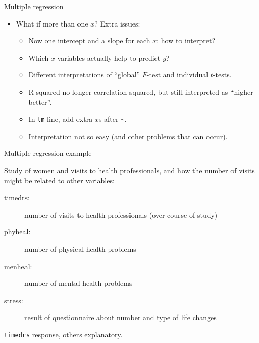 \documentclass[
  ignorenonframetext,
]{beamer}
\begin{document}
\begin{frame}[fragile]{Multiple regression}
\protect\hypertarget{multiple-regression}{}

\begin{itemize}
\item
  What if more than one \(x\)? Extra issues:

  \begin{itemize}
  \item
    Now one intercept and a slope for each \(x\): how to interpret?
  \item
    Which \(x\)-variables actually help to predict \(y\)?
  \item
    Different interpretations of ``global'' \(F\)-test and individual
    \(t\)-tests.
  \item
    R-squared no longer correlation squared, but still interpreted as
    ``higher better''.
  \item
    In \texttt{lm} line, add extra \(x\)s after
    \texttt{\textasciitilde{}}.
  \item
    Interpretation not so easy (and other problems that can occur).
  \end{itemize}
\end{itemize}

\end{frame}

\begin{frame}[fragile]{Multiple regression example}
\protect\hypertarget{multiple-regression-example}{}

Study of women and visits to health professionals, and how the number of
visits might be related to other variables:

\begin{description}
\item[timedrs:] number of visits to health professionals (over course of study)
\item[phyheal:] number of physical health problems
\item[menheal:] number of mental health problems
\item[stress:] result of questionnaire about number and type of life changes
\end{description}

\texttt{timedrs} response, others explanatory.

\end{frame}
\end{document}
